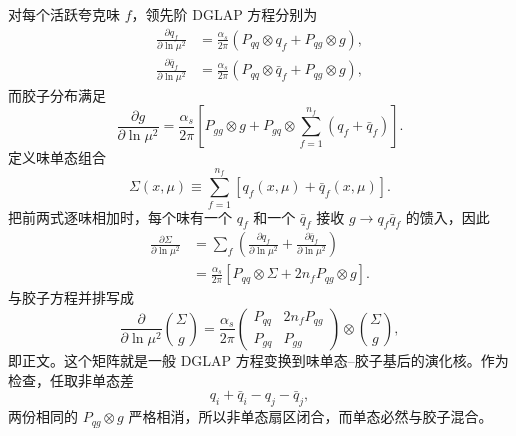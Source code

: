 \begin{derivation}[结构函数的标度破坏]
对每个活跃夸克味 $f$，领先阶 DGLAP 方程分别为
\begin{align*}
 \frac{\partial q_f}{\partial\ln\mu^2}
 &=\frac{\alpha_s}{2\pi}
 \left(P_{qq}\otimes q_f+P_{qg}\otimes g\right),\\
 \frac{\partial \bar q_f}{\partial\ln\mu^2}
 &=\frac{\alpha_s}{2\pi}
 \left(P_{qq}\otimes \bar q_f+P_{qg}\otimes g\right),
\end{align*}
而胶子分布满足
\begin{equation*}
 \frac{\partial g}{\partial\ln\mu^2}
 =\frac{\alpha_s}{2\pi}
 \left[
 P_{gg}\otimes g
 +P_{gq}\otimes\sum_{f=1}^{n_f}(q_f+\bar q_f)
 \right].
\end{equation*}
定义味单态组合
\begin{equation*}
 \Sigma(x,\mu)\equiv
 \sum_{f=1}^{n_f}[q_f(x,\mu)+\bar q_f(x,\mu)].
\end{equation*}
把前两式逐味相加时，每个味有一个 $q_f$ 和一个 $\bar q_f$ 接收 $g\to q_f\bar q_f$ 的馈入，因此
\begin{align*}
 \frac{\partial\Sigma}{\partial\ln\mu^2}
 &=\sum_f\left(
 \frac{\partial q_f}{\partial\ln\mu^2}
 +\frac{\partial\bar q_f}{\partial\ln\mu^2}
 \right)\\
 &=\frac{\alpha_s}{2\pi}
 \left[P_{qq}\otimes\Sigma
 +2n_fP_{qg}\otimes g\right].
\end{align*}
与胶子方程并排写成
\begin{equation*}
 \frac{\partial}{\partial\ln\mu^2}
 \binom{\Sigma}{g}
 =\frac{\alpha_s}{2\pi}
 \begin{pmatrix}
 P_{qq}&2n_fP_{qg}\\
 P_{gq}&P_{gg}
 \end{pmatrix}\otimes
 \binom{\Sigma}{g},
\end{equation*}
即正文。这个矩阵就是一般 DGLAP 方程变换到味单态--胶子基后的演化核。作为检查，任取非单态差
\begin{equation*}
 q_i+\bar q_i-q_j-\bar q_j,
\end{equation*}
两份相同的 $P_{qg}\otimes g$ 严格相消，所以非单态扇区闭合，而单态必然与胶子混合。


\end{derivation}
